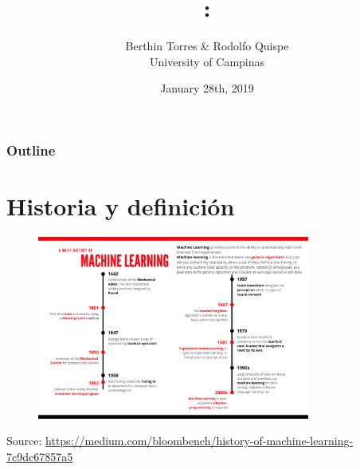 \documentclass[english,svgnames,notes=hide,12pt]{beamer}
\title{\large\seminarname:\\\large\presentationtitle}
\author{Berthin Torres \& Rodolfo Quispe\\
    \small University of Campinas
}
\date{January 28th, 2019}
\begin{document}
\newcommand{\addsource}[1]{\centering\tiny{Source: \url{#1}}}

\thispagestyle{empty}
\begin{frame}
    \titlepage
\end{frame}

\begin{frame}
    \frametitle{Outline}
    \tableofcontents
\end{frame}


\section{Historia y definici\'on}
\begin{frame}
    \begin{figure}
        \includegraphics[width=0.8\textwidth]{imgs/machine-learning-timeline.pdf}
    \end{figure}
    \addsource{https://medium.com/bloombench/history-of-machine-learning-7c9dc67857a5}
\end{frame}
\end{document}
